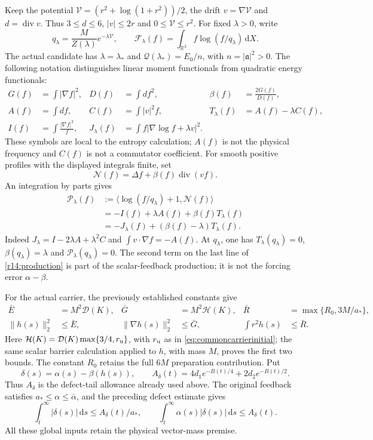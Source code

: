 \documentclass[11pt]{article}
\numberwithin{equation}{section}
\newcommand{\dd}{\,\mathrm d}
\newcommand{\R}{\mathbb R}
\begin{document}
Keep the potential $\mathcal V=(r^2+\log(1+r^2))/2$, the drift
$v=\nabla\mathcal V$ and $d=\operatorname{div}v$. Thus
$3\le d\le6$, $|v|\le2r$ and $0\le\mathcal V\le r^2$.
For fixed $\lambda>0$, write
\[
 q_\lambda=\frac{M}{Z(\lambda)}e^{-\lambda\mathcal V},
 \qquad \mathcal F_\lambda(f)=\int_{\R^3}f\log(f/q_\lambda)\dd X.
\]
The actual candidate has $\lambda=\lambda_*$ and
$\mathcal Q(\lambda_*)=E_0/n$, with $n=|\mathfrak a|^2>0$.
The following notation distinguishes linear moment functionals from
quadratic energy functionals:
\begin{align}
 G(f)&=\int|\nabla f|^2,& D(f)&=\int df^2,&
 \beta(f)&=\frac{2G(f)}{D(f)},\nonumber\\
 A(f)&=\int df,& C(f)&=\int|v|^2f,&
 T_\lambda(f)&=A(f)-\lambda C(f),\label{r14:functionals}\\
 I(f)&=\int\frac{|\nabla f|^2}{f},&
 J_\lambda(f)&=\int f|\nabla\log f+\lambda v|^2.
 \nonumber
\end{align}
These symbols are local to the entropy calculation; $A(f)$ is not the
physical frequency and $C(f)$ is not a commutator coefficient. For smooth
positive profiles with the displayed integrals finite, set
\[
 \mathcal N(f)=\Delta f+\beta(f)\operatorname{div}(vf).
\]
An integration by parts gives
\begin{align}
 \mathcal P_\lambda(f)
 &:=\langle\log(f/q_\lambda)+1,\mathcal N(f)\rangle\nonumber\\
 &=-I(f)+\lambda A(f)+\beta(f)T_\lambda(f)\nonumber\\
 &=-J_\lambda(f)+(\beta(f)-\lambda)T_\lambda(f).
 \label{r14:production}
\end{align}
Indeed $J_\lambda=I-2\lambda A+\lambda^2C$ and
$\int v\cdot\nabla f=-A(f)$. At $q_\lambda$, one has
$T_\lambda(q_\lambda)=0$, $\beta(q_\lambda)=\lambda$ and
$\mathcal P_\lambda(q_\lambda)=0$. The second term on the last line
of \eqref{r14:production} is part of the scalar-feedback production;
it is not the forcing error $\alpha-\beta$.

For the actual carrier, the previously established constants give
\begin{align}
 \bar E&=M^2\mathcal D(K),&
 \bar G&=M^2\mathcal H(K),&
 \bar R&=\max\{R_0,3M/a_*\},\nonumber\\
 \|h(s)\|_2^2&\le\bar E,&
 \|\nabla h(s)\|_2^2&\le\bar G,&
 \int r^2h(s)&\le\bar R.\label{r14:budgets}
\end{align}
Here $\mathcal H(K)=\mathcal D(K)\max\{3/4,r_{\rm u}\}$, with
$r_{\rm u}$ as in \eqref{eq:commoncarrierinitial}; the same scalar
barrier calculation applied to $h$, with mass $M$, proves the first two bounds. The constant
$R_0$ retains the full $6M$ preparation contribution. Put
\begin{equation}\label{r14:defecttail}
 \delta(s)=\alpha(s)-\beta(h(s)),\qquad
 A_\delta(t)=4d_1e^{-B(t)/4}+2d_2e^{-B(t)/2}.
\end{equation}
Thus $A_\delta$ is the defect-tail allowance already used above.
The original feedback satisfies $a_*\le\alpha\le\bar\alpha$, and
the preceding defect estimate gives
\[
 \int_t^\infty|\delta(s)|\dd s
 \le A_\delta(t)/a_*,\qquad
 \int_t^\infty\alpha(s)|\delta(s)|\dd s
 \le A_\delta(t).
\]
All these global inputs retain the physical vector-mass premise.
\end{document}
